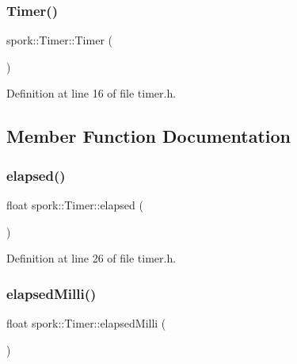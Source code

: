 \subsubsection{\texorpdfstring{Timer()}{Timer()}}
{\footnotesize\ttfamily spork\+::\+Timer\+::\+Timer (\begin{DoxyParamCaption}{ }\end{DoxyParamCaption})\hspace{0.3cm}{\ttfamily [inline]}}



Definition at line 16 of file timer.\+h.



\subsection{Member Function Documentation}
\mbox{\label{classspork_1_1_timer_aa640a87d429bc4c37df2791fd3769f38}} 
\subsubsection{\texorpdfstring{elapsed()}{elapsed()}}
{\footnotesize\ttfamily float spork\+::\+Timer\+::elapsed (\begin{DoxyParamCaption}{ }\end{DoxyParamCaption})\hspace{0.3cm}{\ttfamily [inline]}}



Definition at line 26 of file timer.\+h.

\mbox{\label{classspork_1_1_timer_ac2aa43e7102d1836b13a8d659f79e21a}} 
\subsubsection{\texorpdfstring{elapsed\+Milli()}{elapsedMilli()}}
{\footnotesize\ttfamily float spork\+::\+Timer\+::elapsed\+Milli (\begin{DoxyParamCaption}{ }\end{DoxyParamCaption})\hspace{0.3cm}{\ttfamily [inline]}}



